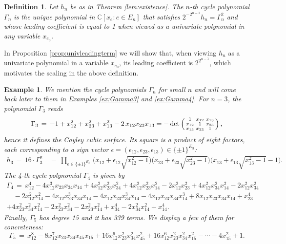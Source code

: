 \documentclass[a4paper, 11pt, twoside]{article}
\theoremstyle{plain}
\newtheorem{definition}[theorem]{Definition}
\newtheorem{example}[theorem]{Example}
\begin{document}
\begin{definition} \label{def:cyclepolynomial}
Let  $h_n$ be as in Theorem \ref{lem:existence}. The \emph{$n$-th cycle polynomial} $\Gamma_n$
 is    the unique  polynomial in  $\mathbb{C}[x_e: e \in E_n]$  that  satisfies $2^{-2^{n-1}} h_n = \Gamma_n^2$ and whose leading coefficient is equal to 1 when viewed as a univariate polynomial in any  variable $x_{e_0}$. 
\end{definition}

In Proposition \ref{prop:univleadingterm} we will show  that,   when viewing $h_n$ as a univariate polynomial in a variable $x_{e_0}$, its leading coefficient is $2^{2^{n-1}} $, which motivates the scaling in the above definition.


\begin{example} \label{ex:smallGamma}
We mention the cycle polynomials $\Gamma_n$ for small $n$ and will come back later to them in Examples \ref{ex:Gamma3} and \ref{ex:Gamma4}. 
    For $n = 3$, the polynomial $\Gamma_3$ reads  
    \[ \Gamma_3 \, = \, -1 + x_{12}^2 + x_{23}^2 + x_{13}^2 - 2\, x_{12}x_{23}x_{13}
    =-\det\left(\begin{smallmatrix} 1 & x_{12}& x_{13}\cr x_{12} & 1 & x_{23}\cr x_{13} & x_{23}& 1 \end{smallmatrix}\right), \] 
    hence it  defines the Cayley cubic surface.
        Its square is a product of eight factors, each corresponding to a sign vector $\epsilon=(\epsilon_{12},\epsilon_{23},\epsilon_{13})\in\{\pm 1\}^{E_3}$:
    \begin{align*}
        h_3 \, = \, 16 \cdot \Gamma_3^2 & \, = \, \prod_{\epsilon\in \{\pm 1\}^{E_3}} \,  \Big(x_{12} +\epsilon_{12}  \sqrt{x_{12}^2-1}\Big)\Big(x_{23} +\epsilon_{23}  \sqrt{x_{23}^2-1}\Big)\Big(x_{13}  +\epsilon_{13}  \sqrt{x_{13}^2-1}-1\Big).
    \end{align*}
The 4-th cycle polynomial $\Gamma_4$ is given by 
    \[ \begin{matrix} \Gamma_4 \, = \,  x_{12}^4 - 4 x_{12}^3 x_{23} x_{34} x_{14} + 4 x_{12}^2 x_{23}^2 x_{34}^2 + 4 x_{12}^2 x_{23}^2 x_{14}^2 - 2 x_{12}^2 x_{23}^2 + 4 x_{12}^2 x_{34}^2 x_{14}^2  - 2 x_{12}^2 x_{34}^2 \\ \quad - 2 x_{12}^2 x_{14}^2 - 4 x_{12} x_{23}^3 x_{34} x_{14} - 4 x_{12} x_{23} x_{34}^3 x_{14} - 4 x_{12} x_{23} x_{34} x_{14}^3 + 8 x_{12} x_{23} x_{34} x_{14} + x_{23}^4 \\ + 4 x_{23}^2 x_{34}^2 x_{14}^2 - 2 x_{23}^2 x_{34}^2 - 2 x_{23}^2 x_{14}^2 + x_{34}^4 - 2 x_{34}^2 x_{14}^2 + x_{14}^4. \end{matrix} \]
    Finally, $\Gamma_5$ has degree 15 and it has 339 terms. We display a few of them for concreteness: 
    \[ \Gamma_5 \, = \, x_{12}^8 - 8 x_{12}^7 x_{23} x_{34} x_{45} x_{15} + 16 x_{12}^6 x_{23}^2 x_{34}^2 x_{45}^2 + 16 x_{12}^6 x_{23}^2 x_{34}^2 x_{15}^2 -  \cdots - 4 x_{15}^2 + 1.\]
\end{example}
\end{document}

